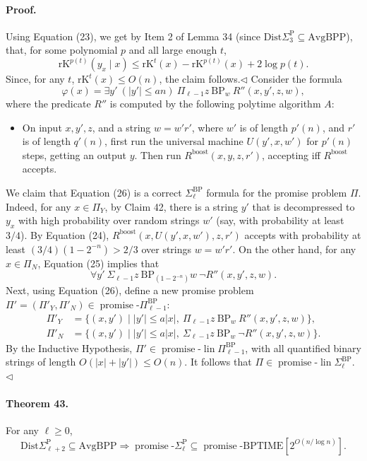 \documentclass[10pt,a4paper]{article}
\begin{document}
\paragraph{Proof.} Using Equation (23), we get by Item 2 of Lemma 34 (since $\mathrm{Dist}\Sigma_3^{\mathrm P}\subseteq\mathrm{AvgBPP}$), that, for some polynomial $p$ and all large enough $t$,
\[\mathrm{rK}^{p(t)}(y_x\mid x)\leq\mathrm{rK}^t(x)-\mathrm{rK}^{p(t)}(x)+2\log p(t).\]
Since, for any $t$, $\mathrm{rK}^t(x)\leq O(n)$, the claim follows.\hfill$\triangleleft$
Consider the formula
\[\varphi(x)=\exists y'\ (|y'|\leq an)\ \Pi_{\ell-1}z\ \mathrm{BP}_w\ R''(x,y',z,w),\tag{26}\]
where the predicate $R''$ is computed by the following polytime algorithm $A$:
\begin{itemize}
\item On input $x,y',z$, and a string $w=w'r'$, where $w'$ is of length $p'(n)$, and $r'$ is of length $q'(n)$, first run the universal machine $U(y',x,w')$ for $p'(n)$ steps, getting an output $y$. Then run $R^{\mathrm{boost}}(x,y,z,r')$, accepting iff $R^{\mathrm{boost}}$ accepts.
\end{itemize}
We claim that Equation (26) is a correct $\Sigma_\ell^{\mathrm{BP}}$ formula for the promise problem $\Pi$. Indeed, for any $x\in\Pi_Y$, by Claim 42, there is a string $y'$ that is decompressed to $y_x$ with high probability over random strings $w'$ (say, with probability at least $3/4$). By Equation (24), $R^{\mathrm{boost}}(x,U(y',x,w'),z,r')$ accepts with probability at least $(3/4)(1-2^{-n})>2/3$ over strings $w=w'r'$. On the other hand, for any $x\in\Pi_N$, Equation (25) implies that
\[\forall y'\ \Sigma_{\ell-1}z\ \mathrm{BP}_{(1-2^{-n})}w\ \neg R''(x,y',z,w).\]
Next, using Equation (26), define a new promise problem $\Pi'=(\Pi'_Y,\Pi'_N)\in\operatorname{promise}\text{-}\Pi_{\ell-1}^{\mathrm{BP}}$:
\begin{align*}
\Pi'_Y&=\{(x,y')\mid|y'|\leq a|x|,\ \Pi_{\ell-1}z\ \mathrm{BP}_w\ R''(x,y',z,w)\},\\
\Pi'_N&=\{(x,y')\mid|y'|\leq a|x|,\ \Sigma_{\ell-1}z\ \mathrm{BP}_w\ \neg R''(x,y',z,w)\}.
\end{align*}
By the Inductive Hypothesis, $\Pi'\in\operatorname{promise}\text{-}\operatorname{lin}\Pi_{\ell-1}^{\mathrm{BP}}$, with all quantified binary strings of length $O(|x|+|y'|)\leq O(n)$. It follows that $\Pi\in\operatorname{promise}\text{-}\operatorname{lin}\Sigma_\ell^{\mathrm{BP}}$.\hfill$\triangleleft$

\paragraph{Theorem 43.} For any $\ell\geq0$,
\[\mathrm{Dist}\Sigma_{\ell+2}^{\mathrm P}\subseteq\mathrm{AvgBPP}\Longrightarrow\operatorname{promise}\text{-}\Sigma_\ell^{\mathrm P}\subseteq\operatorname{promise}\text{-}\mathrm{BPTIME}[2^{O(n/\log n)}].\]
\end{document}
